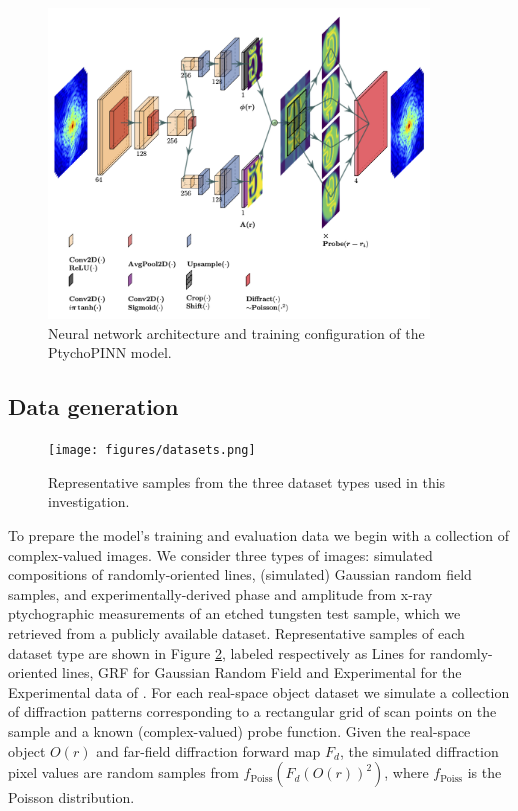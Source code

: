 \documentclass[sn-mathphys]{sn-jnl}%
\theoremstyle{thmstyleone}%
\theoremstyle{thmstyletwo}%
\theoremstyle{thmstylethree}%
\begin{document}
\begin{figure}[h]%
\centering
\includegraphics[width=0.9\textwidth]{figures/lett.png}
\caption{Neural network architecture and training configuration of the PtychoPINN model.}\label{diagram}
\end{figure}

\subsection{Data generation}\label{data}

\begin{figure}
    \centering
    {{\texttt{[image: figures/datasets.png]} }}%
    \caption{Representative samples from the three dataset types used in this investigation.}%
    \label{fig:datasets}%
\end{figure}

To prepare the model's training and evaluation data we begin with a collection of complex-valued images. We consider three types of images: simulated compositions of randomly-oriented lines, (simulated) Gaussian random field samples, and experimentally-derived phase and amplitude from x-ray ptychographic measurements of an etched tungsten test sample, which we retrieved from a publicly available dataset\cite{cherukara2020ai}. Representative samples of each dataset type are shown in Figure \ref{fig:datasets}, labeled respectively as Lines for randomly-oriented lines, GRF for Gaussian Random Field and Experimental for the Experimental data of \cite{cherukara2020ai}. For each real-space object dataset we simulate a collection of diffraction patterns corresponding to a rectangular grid of scan points on the sample and a known (complex-valued) probe function. Given the real-space object $O(r)$ and far-field diffraction forward map $F_d$, the simulated diffraction pixel values are random samples from $f_{\text{Poiss}}(F_d(O(r))^2)$, where $f_{\text{Poiss}}$ is the Poisson distribution.
\end{document}
